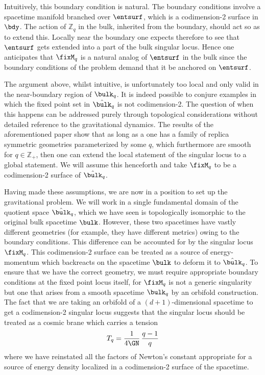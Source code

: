 \documentclass[12pt,openany]{book}
\begin{document}
Intuitively, this boundary condition is natural. The boundary conditions involve a spacetime manifold branched over $\entsurf$, which is a codimension-2 surface in $\bdy$. The action of ${\mathbb Z}_q$ in the bulk, inherited from the boundary, should act so as to extend this. Locally near the boundary one expects therefore to see that
$\entsurf$ gets extended into a part of the bulk singular locus.  Hence one anticipates that $\fixM_q$ is a natural analog of $\entsurf$ in the bulk since the boundary conditions of the problem demand that it be anchored on $\entsurf$.

The argument above, whilst intuitive, is unfortunately too local and only valid in the near-boundary region of $\bulk_q$. It is indeed possible to conjure examples \cite{Haehl:2014zoa} in which the fixed point set in ${\hat \bulk}_q$ is not codimension-2. The question of when this happens can be addressed purely through topological considerations without detailed reference to the gravitational dynamics. The results of the aforementioned paper show that as long as a one has a family of replica symmetric geometries parameterized by some $q$, which furthermore are smooth for $q \in {\mathbb Z}_+$, then one can  extend the local statement of the singular locus to a global statement. We will assume this henceforth and take $\fixM_q$ to be a codimension-2 surface of ${\hat \bulk}_q$.


Having made these assumptions, we are now in a position to set up the gravitational problem. We will work in a single fundamental domain of the quotient space  ${\hat \bulk}_q$, which we have seen is topologically  isomorphic to the original bulk spacetime $\bulk$.  However, these two spacetimes have vastly different geometries (for example,  they have different metrics) owing to the boundary conditions. This difference can be accounted for by the singular locus $\fixM_q$. This codimension-2 surface can be treated as a source of energy-momentum which backreacts on the spacetime $\bulk$ to deform it to ${\hat \bulk}_q$. To ensure that  we have the correct geometry, we must require appropriate boundary conditions at the fixed point locus itself, for $\fixM_q$ is not a generic singularity but one that arises from a smooth spacetime $\bulk_q$ by an orbifold construction. The fact that we are taking an orbifold of a $(d+1)$-dimensional spacetime to get a codimension-2 singular locus suggests that the singular locus should be treated as a cosmic brane which carries a tension
%
\begin{equation}
T_q = \frac{1}{4\GN}\, \frac{q-1}{q}
\label{eq:ctesion}
\end{equation}
%
where we have reinstated all the factors of Newton's constant appropriate for a source of energy density localized in a codimension-2 surface of the spacetime.
\end{document}
